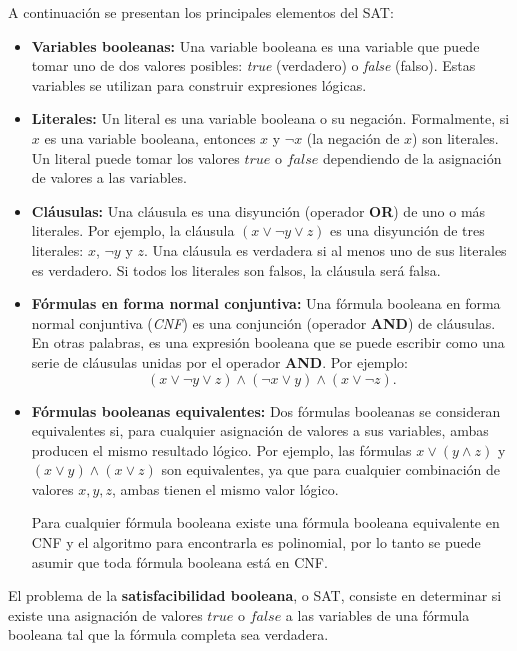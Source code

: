 A continuación se presentan los principales elementos del SAT:

\begin{itemize}
  \item \textbf{Variables booleanas:}
        Una variable booleana es una variable que puede tomar uno de dos valores posibles: \textit{true} (verdadero) o \textit{false} (falso). Estas variables se utilizan para construir expresiones lógicas.
  \item \textbf{Literales:}
        Un literal es una variable booleana o su negación. Formalmente, si \( x \) es una variable booleana, entonces \( x \) y \( \neg x \) (la negación de \( x \)) son literales. Un literal puede tomar los valores \( true \) o \( false \) dependiendo de la asignación de valores a las variables.
  \item  \textbf{Cláusulas:}
        Una cláusula es una disyunción (operador \textbf{OR}) de uno o más literales. Por ejemplo, la cláusula \( (x \vee \neg y \vee z) \) es una disyunción de tres literales: \( x \), \( \neg y \) y \( z \). Una cláusula es verdadera si al menos uno de sus literales es verdadero. Si todos los literales son falsos, la cláusula será falsa.
  \item \textbf{Fórmulas en forma normal conjuntiva:}
        Una fórmula booleana en forma normal conjuntiva (\textit{CNF}) es una conjunción (operador \textbf{AND}) de cláusulas. En otras palabras, es una expresión booleana que se puede escribir como una serie de cláusulas unidas por el operador \textbf{AND}. Por ejemplo:        
        \[
          (x \vee \neg y \vee z) \wedge (\neg x \vee y) \wedge (x \vee \neg z).
        \]
  \item \textbf{Fórmulas booleanas equivalentes:}
        Dos fórmulas booleanas se consideran equivalentes si, para cualquier asignación de valores a sus variables, ambas producen el mismo resultado lógico. Por ejemplo, las fórmulas \( x \vee (y \wedge z) \) y \( (x \vee y) \wedge (x \vee z) \) son equivalentes, ya que para cualquier combinación de valores \( x, y, z \), ambas tienen el mismo valor lógico.
        
        Para cualquier fórmula booleana existe una fórmula booleana equivalente en CNF \cite{authomataTheory} y 
        el algoritmo para encontrarla es polinomial, por lo tanto se puede asumir que toda fórmula booleana está en CNF.
        
\end{itemize}

\begin{definition}  
  El problema de la \textbf{satisfacibilidad booleana}, o SAT, consiste en determinar si existe una asignación de valores \( true \) o \( false \) a las variables de una fórmula booleana tal que la fórmula completa sea verdadera. 
\end{definition}

